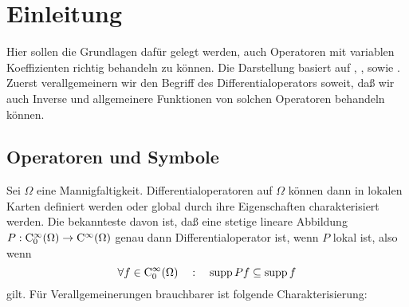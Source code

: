 \chapter{Einleitung}
Hier sollen die Grundlagen dafür gelegt werden, auch Operatoren mit variablen Koeffizienten richtig behandeln zu können. Die Darstellung basiert auf \cite{Hormander:1965}, \cite{Hormander:1966}, sowie \cite[Kapitel 18]{Hormander:1985}. Zuerst verallgemeinern wir den Begriff des Differentialoperators soweit, daß wir auch Inverse und allgemeinere Funktionen von solchen Operatoren behandeln können. 

\section{Operatoren und Symbole}
Sei $\Omega$ eine Mannigfaltigkeit. Differentialoperatoren auf $\Omega$ können dann in lokalen Karten definiert werden oder global durch ihre Eigenschaften charakterisiert werden. Die bekannteste davon ist, daß eine stetige lineare Abbildung $P:\mathrm C_0^\infty(\Omega)\to\mathrm C^\infty(\Omega)$ genau dann Differentialoperator ist, wenn $P$ lokal ist, also wenn
\begin{equation}
  \forall f\in\mathrm C_0^\infty(\Omega)\quad:\quad \operatorname{supp} Pf \subseteq \operatorname{supp} f
\end{equation}
gilt. Für Verallgemeinerungen brauchbarer ist folgende Charakterisierung:


